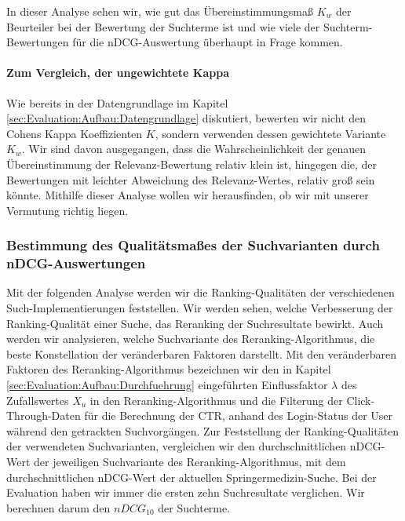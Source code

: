 In dieser Analyse sehen wir, wie gut das Übereinstimmungsmaß $K_w$ der Beurteiler bei der Bewertung der Suchterme ist und wie viele der Suchterm-Bewertungen für die nDCG-Auswertung überhaupt in Frage kommen. 



\paragraph{Zum Vergleich, der ungewichtete Kappa}
Wie bereits in der Datengrundlage im Kapitel \ref{sec:Evaluation:Aufbau:Datengrundlage} diskutiert, bewerten wir nicht den Cohens Kappa Koeffizienten $K$, sondern verwenden dessen gewichtete Variante $K_w$. Wir sind davon ausgegangen, dass die Wahrscheinlichkeit der genauen Übereinstimmung der Relevanz-Bewertung relativ klein ist, hingegen die, der Bewertungen mit leichter Abweichung des Relevanz-Wertes, relativ groß sein könnte. Mithilfe dieser Analyse wollen wir herausfinden, ob wir mit unserer Vermutung richtig liegen.



\subsubsection{Bestimmung des Qualitätsmaßes der Suchvarianten durch nDCG-Auswertungen}
\label{sec:Evaluation:Auswertung:QuantitativeAuswertung:nDCG}

Mit der folgenden Analyse werden wir die Ranking-Qualitäten der verschiedenen Such-Implementierungen feststellen. Wir werden sehen, welche Verbesserung der Ranking-Qualität einer Suche, das Reranking der Suchresultate bewirkt. Auch werden wir analysieren, welche Suchvariante des Reranking-Algorithmus, die beste Konstellation der veränderbaren Faktoren darstellt. Mit den veränderbaren Faktoren des Reranking-Algorithmus bezeichnen wir den in Kapitel \ref{sec:Evaluation:Aufbau:Durchfuehrung} eingeführten Einflussfaktor $\lambda$ des Zufallswertes $X_u$ in den Reranking-Algorithmus und die Filterung der Click-Through-Daten für die Berechnung der CTR, anhand des Login-Status der User während den getrackten Suchvorgängen. Zur Feststellung der Ranking-Qualitäten der verwendeten Suchvarianten, vergleichen wir den durchschnittlichen nDCG-Wert der jeweiligen Suchvariante des Reranking-Algorithmus, mit dem durchschnittlichen nDCG-Wert der aktuellen Springermedizin-Suche. Bei der Evaluation haben wir immer die ersten zehn Suchresultate verglichen. Wir berechnen darum den $nDCG_{10}$ der Suchterme.

